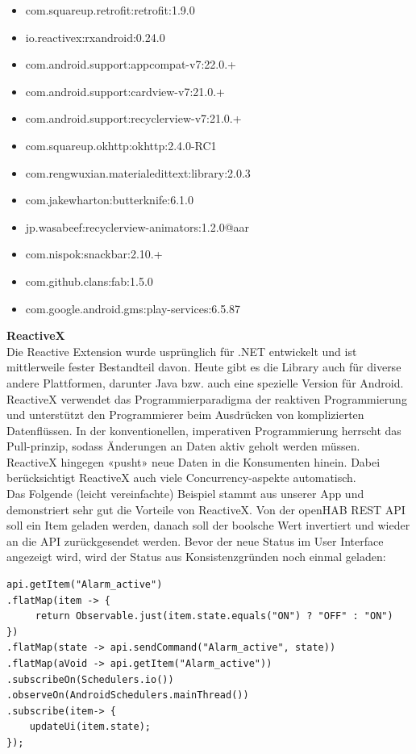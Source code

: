 \begin{itemize}
	\item com.squareup.retrofit:retrofit:1.9.0
    \item io.reactivex:rxandroid:0.24.0
    \item com.android.support:appcompat-v7:22.0.+
    \item com.android.support:cardview-v7:21.0.+
    \item com.android.support:recyclerview-v7:21.0.+
    \item com.squareup.okhttp:okhttp:2.4.0-RC1
    \item com.rengwuxian.materialedittext:library:2.0.3
    \item com.jakewharton:butterknife:6.1.0
    \item jp.wasabeef:recyclerview-animators:1.2.0@aar
    \item com.nispok:snackbar:2.10.+
    \item com.github.clans:fab:1.5.0
    \item com.google.android.gms:play-services:6.5.87
\end{itemize}


\textbf{ReactiveX} \\
Die Reactive Extension wurde usprünglich für .NET entwickelt und ist mittlerweile fester Bestandteil davon. Heute gibt es die Library auch für diverse andere Plattformen, darunter Java bzw. auch eine spezielle Version für Android. ReactiveX verwendet das Programmierparadigma der reaktiven Programmierung und unterstützt den Programmierer beim Ausdrücken von komplizierten Datenflüssen. In der konventionellen, imperativen Programmierung herrscht das Pull-prinzip, sodass Änderungen an Daten aktiv geholt werden müssen. ReactiveX hingegen «pusht» neue Daten in die Konsumenten hinein. Dabei berücksichtigt ReactiveX auch viele Concurrency-aspekte automatisch.\\

Das Folgende (leicht vereinfachte) Beispiel stammt aus unserer App und demonstriert sehr gut die Vorteile von ReactiveX. Von der openHAB REST API soll ein Item geladen werden, danach soll der boolsche Wert invertiert und wieder an die API zurückgesendet werden. Bevor der neue Status im User Interface angezeigt wird, wird der Status aus Konsistenzgründen noch einmal geladen:
\pagebreak
\begin{lstlisting}[style=csharp, caption=ToggleActivity.java - toggleAlarm]
api.getItem("Alarm_active")
.flatMap(item -> {
	 return Observable.just(item.state.equals("ON") ? "OFF" : "ON")
})
.flatMap(state -> api.sendCommand("Alarm_active", state))
.flatMap(aVoid -> api.getItem("Alarm_active"))
.subscribeOn(Schedulers.io())
.observeOn(AndroidSchedulers.mainThread())
.subscribe(item-> {
	updateUi(item.state);
});
\end{lstlisting}


